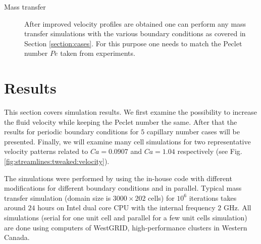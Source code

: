 \documentclass[review,12pt]{elsarticle}
\newcommand{\ububble}{U_{\mathrm{bubble}}}
\begin{document}
\begin{description}
\item[Mass transfer] After improved velocity profiles are obtained one can perform any mass
transfer simulations with the various boundary conditions as covered in Section \ref{section:cases}.
For this purpose one needs to match the Peclet number $Pe$ taken from experiments. 
\end{description}

\section{Results}
This section covers simulation results. We first examine the possibility to increase the fluid
velocity while keeping the Peclet number the same. After that  the results for  periodic boundary
conditions for $5$ capillary number cases will be presented. Finally, we will examine
many
cell simulations for two representative velocity patterns related to $Ca=0.0907$ and $Ca=1.04$ respectively 
(see Fig. \ref{fig:streamlines:tweaked:velocity}). 

{\color{red} The simulations were performed by using the in-house code with different modifications for different boundary conditions and in parallel. Typical mass transfer simulation (domain size is $3000\times202$ cells) for $10^{6}$ iterations takes around $24$ hours on Intel dual core CPU with the internal frequency $2$ GHz. All simulations (serial for one unit cell and parallel for a few unit cells simulation) are done using computers of WestGRID, high-performance clusters in Western Canada. }
\end{document}

